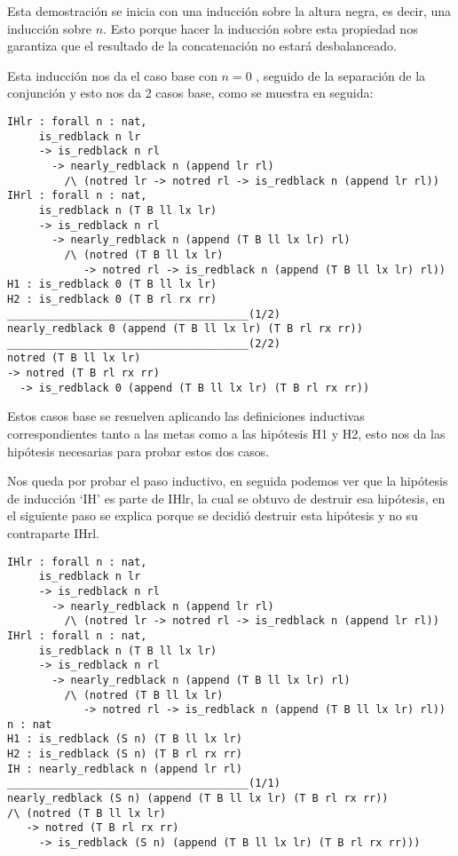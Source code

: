 Esta demostraci\'on se inicia con una inducci\'on sobre la altura negra, es decir, una inducción sobre $n$. Esto porque hacer la inducción sobre esta propiedad nos garantiza que el resultado de la concatenación no estará desbalanceado.

Esta inducci\'on nos da el caso base con $n=0$
, seguido de la separaci\'on de la conjunci\'on y esto nos da 2 casos base, como se muestra en
seguida:

\begin{verbatim}
IHlr : forall n : nat,
     is_redblack n lr
     -> is_redblack n rl
       -> nearly_redblack n (append lr rl)
         /\ (notred lr -> notred rl -> is_redblack n (append lr rl))
IHrl : forall n : nat,
     is_redblack n (T B ll lx lr)
     -> is_redblack n rl
       -> nearly_redblack n (append (T B ll lx lr) rl)
         /\ (notred (T B ll lx lr)
            -> notred rl -> is_redblack n (append (T B ll lx lr) rl))
H1 : is_redblack 0 (T B ll lx lr)
H2 : is_redblack 0 (T B rl rx rr)
______________________________________(1/2)
nearly_redblack 0 (append (T B ll lx lr) (T B rl rx rr))
______________________________________(2/2)
notred (T B ll lx lr)
-> notred (T B rl rx rr)
  -> is_redblack 0 (append (T B ll lx lr) (T B rl rx rr))
\end{verbatim}

Estos casos base se resuelven aplicando las definiciones inductivas correspondientes tanto a las
metas como a las hip\'otesis H1 y H2, esto nos da las hipótesis necesarias para probar estos dos
casos.

Nos queda por probar el paso inductivo, en seguida podemos ver que la hipótesis de inducci\'on
`IH' es parte de IHlr, la cual se obtuvo de destruir esa hipótesis, en el siguiente paso se explica porque se decidió destruir esta hip\'otesis y no su contraparte IHrl.

\begin{verbatim}
IHlr : forall n : nat,
     is_redblack n lr
     -> is_redblack n rl
       -> nearly_redblack n (append lr rl)
         /\ (notred lr -> notred rl -> is_redblack n (append lr rl))
IHrl : forall n : nat,
     is_redblack n (T B ll lx lr)
     -> is_redblack n rl
       -> nearly_redblack n (append (T B ll lx lr) rl)
         /\ (notred (T B ll lx lr)
            -> notred rl -> is_redblack n (append (T B ll lx lr) rl))
n : nat
H1 : is_redblack (S n) (T B ll lx lr)
H2 : is_redblack (S n) (T B rl rx rr)
IH : nearly_redblack n (append lr rl)
______________________________________(1/1)
nearly_redblack (S n) (append (T B ll lx lr) (T B rl rx rr))
/\ (notred (T B ll lx lr)
   -> notred (T B rl rx rr)
     -> is_redblack (S n) (append (T B ll lx lr) (T B rl rx rr)))
\end{verbatim}

